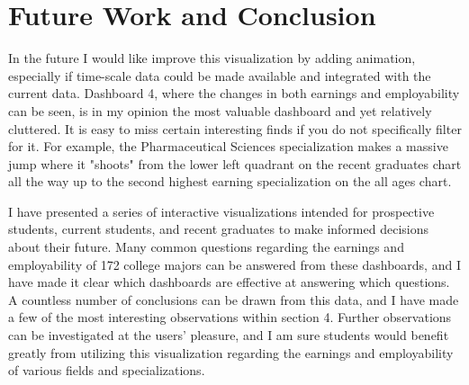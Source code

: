 \documentclass[sigchi]{acmart}
\providecommand\BibTeX{{%
    \normalfont B\kern-0.5em{\scshape i\kern-0.25em b}\kern-0.8em\TeX}}}
\begin{document}
\section{Future Work and Conclusion}
In the future I would like improve this visualization by adding animation, especially if time-scale data could be made available and integrated with the current data. Dashboard 4, where the changes in both earnings and employability can be seen, is in my opinion the most valuable dashboard and yet relatively cluttered. It is easy to miss certain interesting finds if you do not specifically filter for it. For example, the Pharmaceutical Sciences specialization makes a massive jump where it "shoots" from the lower left quadrant on the recent graduates chart all the way up to the second highest earning specialization on the all ages chart.

I have presented a series of interactive visualizations intended for prospective students, current students, and recent graduates to make informed decisions about their future. Many common questions regarding the earnings and employability of 172 college majors can be answered from these dashboards, and I have made it clear which dashboards are effective at answering which questions. A countless number of conclusions can be drawn from this data, and I have made a few of the most interesting observations within section 4. Further observations can be investigated at the users' pleasure, and I am sure students would benefit greatly from utilizing this visualization regarding the earnings and employability of various fields and specializations. 




%   
%   
\end{document}
